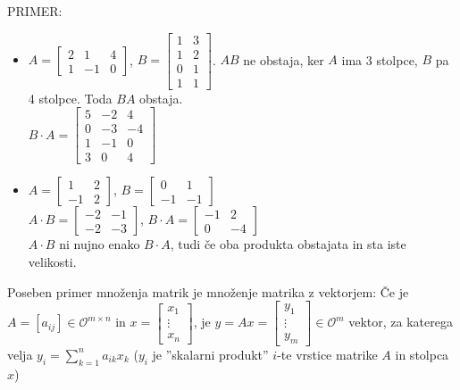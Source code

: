 \documentclass[a4paper,12pt]{article}
\begin{document}
PRIMER:
\begin{itemize}
	\item $A = 
	\begin{bmatrix}
		2&1&4\\
		1&-1&0
	\end{bmatrix}$, $B=
	\begin{bmatrix}
		1&3\\
		1&2\\
		0&1\\
		1&1
	\end{bmatrix}$. $AB$ ne obstaja, ker $A$ ima 3 stolpce, $B$ pa 4 stolpce. Toda $BA$ obstaja. \\

	$B\cdot A=
	\begin{bmatrix}
		5&-2&4\\
		0&-3&-4\\
		1&-1&0\\
		3&0&4
	\end{bmatrix}$

	\item $A= \begin{bmatrix}
		1&2\\
		-1&2
	\end{bmatrix}$, $B=\begin{bmatrix}
		0&1\\
		-1&-1
	\end{bmatrix}$ \\

	$A\cdot B=\begin{bmatrix}
		-2&-1 \\
		-2&-3
	\end{bmatrix}$, $B\cdot A=\begin{bmatrix}
		-1&2\\
		0&-4
	\end{bmatrix}$ \\

	$A\cdot B$ ni nujno enako $B\cdot A$, tudi če oba produkta obstajata in sta iste velikosti. \\
\end{itemize}

Poseben primer množenja matrik je množenje matrika z vektorjem: Če je $A=[a_{ij}]\in \mathcal{O}^{m\times n}$ in $x=\begin{bmatrix} x_1 \\ \vdots \\ x_n \end{bmatrix}$, je $y=Ax=\begin{bmatrix} y_1 \\ \vdots \\ y_m \end{bmatrix} \in \mathcal{O}^m$ vektor, za katerega velja $y_i=\sum_{k=1}^n a_{ik}x_k$ ($y_i$ je ''skalarni produkt'' $i$-te vrstice matrike $A$ in stolpca $x$) \\
\end{document}
